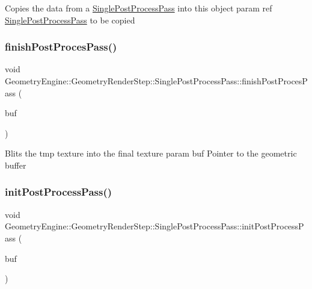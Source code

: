 Copies the data from a \mbox{\hyperlink{class_geometry_engine_1_1_geometry_render_step_1_1_single_post_process_pass}{Single\+Post\+Process\+Pass}} into this object param ref \mbox{\hyperlink{class_geometry_engine_1_1_geometry_render_step_1_1_single_post_process_pass}{Single\+Post\+Process\+Pass}} to be copied \mbox{\label{class_geometry_engine_1_1_geometry_render_step_1_1_single_post_process_pass_acc435e016a5e45decba630f5965b2408}} 
\subsubsection{\texorpdfstring{finishPostProcesPass()}{finishPostProcesPass()}}
{\footnotesize\ttfamily void Geometry\+Engine\+::\+Geometry\+Render\+Step\+::\+Single\+Post\+Process\+Pass\+::finish\+Post\+Proces\+Pass (\begin{DoxyParamCaption}\item[{\mbox{\hyperlink{class_geometry_engine_1_1_geometry_buffer_1_1_g_buffer}{Geometry\+Buffer\+::\+G\+Buffer}} $\ast$}]{buf }\end{DoxyParamCaption})\hspace{0.3cm}{\ttfamily [protected]}}

Blits the tmp texture into the final texture param buf Pointer to the geometric buffer \mbox{\label{class_geometry_engine_1_1_geometry_render_step_1_1_single_post_process_pass_afb298edabcc05c78af2057da15476f78}} 
\subsubsection{\texorpdfstring{initPostProcessPass()}{initPostProcessPass()}}
{\footnotesize\ttfamily void Geometry\+Engine\+::\+Geometry\+Render\+Step\+::\+Single\+Post\+Process\+Pass\+::init\+Post\+Process\+Pass (\begin{DoxyParamCaption}\item[{\mbox{\hyperlink{class_geometry_engine_1_1_geometry_buffer_1_1_g_buffer}{Geometry\+Buffer\+::\+G\+Buffer}} $\ast$}]{buf }\end{DoxyParamCaption})\hspace{0.3cm}{\ttfamily [protected]}}

